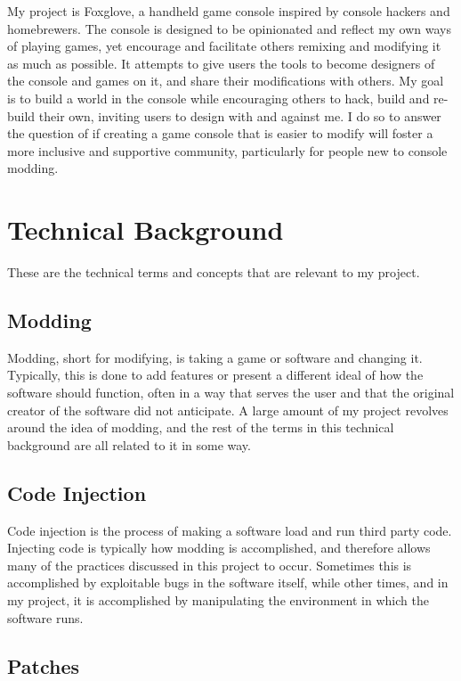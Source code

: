 \documentclass[10pt,twocolumn]{article}
\begin{document}
My project is Foxglove, a handheld game console inspired by console hackers and
homebrewers. The console is designed to be opinionated and reflect my own ways
of playing games, yet encourage and facilitate others remixing and modifying it
as much as possible. It attempts to give users the tools to become designers of
the console and games on it, and share their modifications with others. My goal
is to build a world in the console while encouraging others to hack, build
and re-build their own, inviting users to design with and against me. I do so
to answer the question of if creating a game console that is easier to modify
will foster a more inclusive and supportive community, particularly for people
new to console modding.

\section{Technical Background}

These are the technical terms and concepts that are relevant to my project.

\subsection{Modding}

Modding, short for modifying, is taking a game or software and changing it.
Typically, this is done to add features or present a different ideal of how the
software should function, often in a way that serves the user and that the
original creator of the software did not anticipate. A large amount of my
project revolves around the idea of modding, and the rest of the terms in this
technical background are all related to it in some way.

\subsection{Code Injection}

Code injection is the process of making a software load and run third party
code. Injecting code is typically how modding is accomplished, and therefore
allows many of the practices discussed in this project to occur. Sometimes this
is accomplished by exploitable bugs in the software itself, while other times,
and in my project, it is accomplished by manipulating the environment in which
the software runs.

\subsection{Patches}
\end{document}
